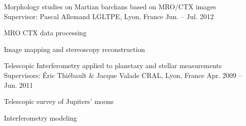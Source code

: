 \begin{cventries}
  \cventry
    {Morphology studies on Martian barchans based on MRO/CTX images}
    {Supervisor: Pascal Allemand}
    {LGLTPE, Lyon, France}
    {Jun. -- Jul. 2012}
    {
      \begin{cvitems}
        \item{MRO CTX data processing}
        \item{Image mapping and stereoscopy reconstruction}
      \end{cvitems}
    }

  \cventry
    {Telescopic Interferometry applied to planetary and stellar measurements}
    {Supervisors: Éric Thiébault \& Jacque Valade}
    {CRAL, Lyon, France}
    {Apr. 2009 -- Jun. 2011}
    {
      \begin{cvitems}
        \item{Telescopic survey of Jupiters' moons}
        \item{Interferometry modeling}
      \end{cvitems}
    }

\end{cventries}
